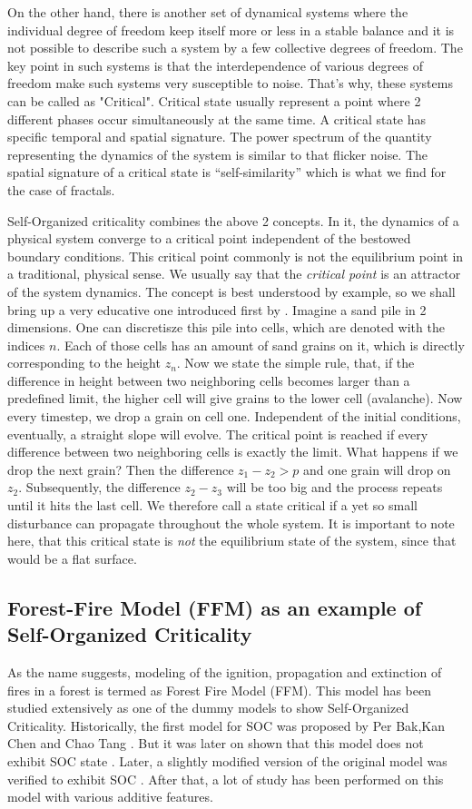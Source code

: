 \documentclass[11pt]{article}
\begin{document}
On the other hand, there is another set of dynamical systems where the individual degree of freedom keep itself more or less in a stable balance and it is not possible to describe such a system by a few collective degrees of freedom. The key point in such systems is that the interdependence of various degrees of freedom make such systems very susceptible to noise. That's why, these systems can be called as "Critical". Critical state usually represent a point where 2 different phases occur simultaneously at the same time. A critical state has specific temporal and spatial signature. The power spectrum of the quantity representing the dynamics of the system is similar to that flicker noise. The spatial signature of a critical state is ``self-similarity'' which is what we find for the case of fractals.

Self-Organized criticality combines the above 2 concepts. In it, the dynamics of a physical system converge to a critical point independent of the bestowed boundary conditions. This critical point commonly is not the equilibrium point in a traditional, physical sense. We usually say that the \textit{critical point} is an attractor of the system dynamics. The concept is best understood by example, so we shall bring up a very educative one introduced first by \cite{ref3}. 
Imagine a sand pile in 2 dimensions. One can discretisze this pile into cells, which are denoted with the indices $n$. Each of those cells has an amount of sand grains on it, which is directly corresponding to the height $z_{n}$. Now we state the simple rule, that, if the difference in height between two neighboring cells becomes larger than a predefined limit, the higher cell will give grains to the lower cell (avalanche). Now every timestep, we drop a grain on cell one. Independent of the initial conditions, eventually, a straight slope will evolve. The critical point is reached if every difference between two neighboring cells is exactly the limit. What happens if we drop the next grain? Then the difference $z_{1}-z_{2}>p$ and one grain will drop on $z_{2}$. Subsequently, the difference $z_{2}-z_{3}$ will be too big and the process repeats until it hits the last cell. We therefore call a state critical if a yet so small disturbance can propagate throughout the whole system.
It is important to note here, that this critical state is \emph{not} the equilibrium state of the system, since that would be a flat surface. 

\subsection{Forest-Fire Model (FFM) as an example of Self-Organized Criticality}
As the name suggests, modeling of the ignition, propagation and extinction of fires in a forest is termed as Forest Fire Model (FFM). This model has been studied extensively as one of the dummy models to show Self-Organized Criticality. Historically, the first model for SOC was proposed by Per Bak,Kan Chen and Chao Tang \cite{ref4}. But it was later on shown that this model does not exhibit SOC state \cite{ref5,ref6}. Later, a slightly modified version of the original model was verified to exhibit SOC \cite{ref7}. After that, a lot of study has been performed on this model with various additive features. 
\end{document}
